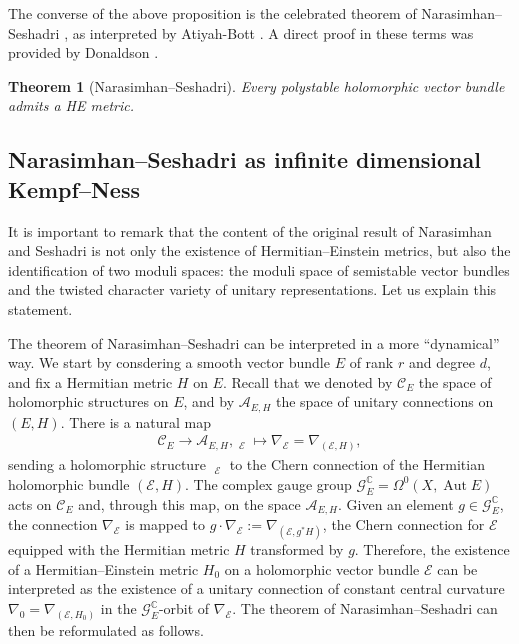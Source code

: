 \documentclass[12pt,a4paper]{amsbook}
\newtheorem{thm}{Theorem}[chapter]
\theoremstyle{remark} \newtheorem{rmk}[thm]{Remark}
\theoremstyle{definition} \newtheorem{defn}[thm]{Definition}
\theoremstyle{definition} \newtheorem{ex}[thm]{Example}
\theoremstyle{definition} \newtheorem{ej}{Exercise}
\newcommand{\C}{\mathbb C}
\newcommand{\cA}{\mathcal A}
\newcommand{\cC}{\mathcal C}
\newcommand{\cG}{\mathcal G}
\newcommand{\sE}{\mathscr E}
\DeclareMathOperator{\Aut}{Aut}
\DeclareMathOperator{\delbar}{\bar{\partial}}
\begin{document}
The converse of the above proposition is the celebrated theorem of Narasimhan--Seshadri \cite{NarasimhanSeshadri}, as interpreted by Atiyah-Bott \cite{AtiyahBott}. A direct proof in these terms was provided by Donaldson \cite{DonaldsonNS}.

\begin{thm}[Narasimhan--Seshadri]
Every polystable holomorphic vector bundle admits a HE metric.
\end{thm}

\subsection*{Narasimhan--Seshadri as infinite dimensional Kempf--Ness}
It is important to remark that the content of the original result of Narasimhan and Seshadri is not only the existence of Hermitian--Einstein metrics, but also the identification of two moduli spaces: the moduli space of semistable vector bundles and the twisted character variety of unitary representations. Let us explain this statement.

The theorem of Narasimhan--Seshadri can be interpreted in a more ``dynamical'' way. We start by consdering a smooth vector bundle $E$ of rank $r$ and degree $d$, and fix a Hermitian metric $H$ on $E$. Recall that we denoted by $\cC_E$ the space of holomorphic structures on $E$, and by $\cA_{E,H}$ the space of unitary connections on $(E,H)$. There is a natural map
\begin{align*}
\cC_E  \longrightarrow \cA_{E,H}, \delbar_{\sE} \longmapsto \nabla_{\sE}=\nabla_{(\sE,H)},
\end{align*}
sending a holomorphic structure $\delbar_{\sE}$ to the Chern connection of the Hermitian holomorphic bundle $(\sE,H)$. The complex gauge group $\cG^\C_E = \Omega^0(X,\Aut E)$ acts on $\cC_E$ and, through this map, on the space $\cA_{E,H}$. Given an element $g\in \cG^\C_E$, the connection $\nabla_{\sE}$ is mapped to $g\cdot \nabla_{\sE}:=\nabla_{(\sE,g^* H)}$, the Chern connection for $\sE$ equipped with the Hermitian metric $H$ transformed by $g$. Therefore, the existence of a Hermitian--Einstein metric $H_0$ on a holomorphic vector bundle $\sE$ can be interpreted as the existence of a unitary connection of constant central curvature $\nabla_0=\nabla_{(\sE,H_0)}$ in the $\cG^\C_E$-orbit of $\nabla_{\sE}$. The theorem of Narasimhan--Seshadri can then be reformulated as follows.
\end{document}
